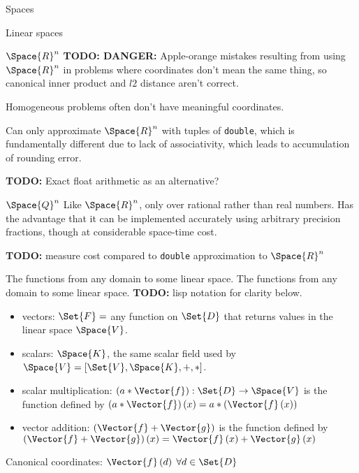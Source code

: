 \begin{plSection}{Spaces}
\begin{plSection}{Linear spaces}
\begin{plExample}{$\Space{R}^n$}{}
\textbf{TODO: DANGER:} Apple-orange mistakes resulting from
using $\Space{R}^n$ in problems where coordinates don't mean the
same thing, so canonical inner product and $l2$ distance
aren't correct.

Homogeneous problems often don't have meaningful coordinates.

Can only approximate $\Space{R}^n$ with tuples of \texttt{double},
which is fundamentally different due to lack of associativity,
which leads to accumulation of rounding error.

\end{plExample}

\textbf{TODO:} Exact float arithmetic as an alternative?

\begin{plExample}{$\Space{Q}^n$}{}
Like $\Space{R}^n$, only over rational rather than real numbers.
Has the advantage that it can be implemented accurately
using arbitrary precision fractions, though at considerable
space-time cost.

\textbf{TODO:} measure cost compared to \texttt{double}
approximation to $\Space{R}^n$
\end{plExample}


\begin{plExample}{The functions from any domain to some linear space.}{}
The functions from any domain to some linear space.
\textbf{TODO:} lisp notation for clarity below.
\begin{itemize}
  \item vectors: $\Set{F} = $ any function on $\Set{D}$
  that returns values in the linear space $\Space{V}$.
  \item scalars: $\Space{K}$, the same scalar field used by
  $\Space{V}=\left[ \Set{V}, \Space{K}, +, * \right]$.
  \item scalar multiplication:
  $ \left(a*\Vector{f}\right) : \Set{D} \rightarrow \Space{V}$
  is the function defined by
   $ \left(a*\Vector{f}\right) (x)
   = a*\left(\Vector{f}\left( x \right) \right) $
  \item vector addition:
  $\left( \Vector{f} + \Vector{g} \right) $
  is the function defined by
  $\left( \Vector{f} + \Vector{g} \right) \left( x \right) =
  \Vector{f} \left( x \right) + \Vector{g} \left( x\right)$
\end{itemize}
Canonical coordinates: 
$\Vector{f}\left( d \right) \; \forall d \in \Set{D}$
\end{plExample}


\end{plSection}
\end{plSection}
